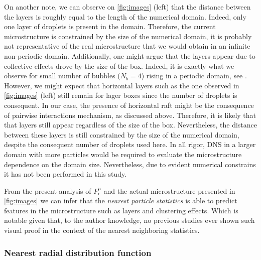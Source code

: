 On another note, we can observe on \ref{fig:images} (left) that the distance between the layers is roughly equal to the length of the numerical domain. 
Indeed, only one layer of droplets is present in the domain. 
Therefore, the current microstructure is constrained by the size of the numerical domain, it is probably not representative of the real microstructure that we would obtain in an infinite non-periodic domain. 
Additionally, one might argue that the layers appear due to collective effects drove by the size of the box.
Indeed, it is exactly what we observe for small number of bubbles ($N_b = 4$) rising in a periodic domain, see \citet{loisy2017}. 
However, we might expect that horizontal layers such as the one observed in \ref{fig:images} (left) still remain for lager boxes since the number of droplets is consequent.
In our case, the presence of horizontal raft might be the consequence of pairwise interactions mechanism, as discussed above. 
Therefore, it is likely that that layers still appear regardless of the size of the box.
Nevertheless, the distance between these layers is still constrained by the size of the numerical domain, despite the consequent number of droplets used here. 
In all rigor, DNS in a larger domain with more particles would be required to evaluate the microstructure dependence on the domain size. 
Nevertheless, due to evident numerical constrains it has not been performed in this study.  

From the present analysis of $P_\text{r}^n$ and the actual microstructure presented in \ref{fig:images} we can infer that the \textit{nearest particle statistics} is able to predict features in the microstructure such as layers and clustering effects. 
Which is notable given that, to the author knowledge, no previous studies ever shown such visual proof in the context of the nearest neighboring statistics. 


\subsubsection*{Nearest radial distribution function }

